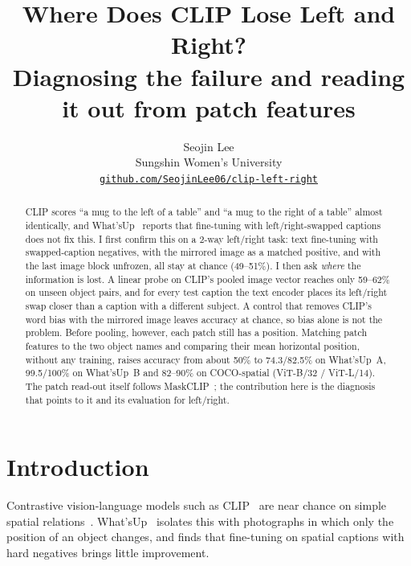 \documentclass[10pt,twocolumn,letterpaper]{article}
\title{Where Does CLIP Lose Left and Right?\\
\large Diagnosing the failure and reading it out from patch features}
\author{Seojin Lee\\
Sungshin Women's University\\
{\tt\small \href{https://github.com/SeojinLee06/clip-left-right}{github.com/SeojinLee06/clip-left-right}}
}
\begin{document}
\maketitle

\begin{abstract}
CLIP scores ``a mug to the left of a table'' and ``a mug to the right of a table'' almost identically, and What'sUp~\cite{kamath2023whatsup} reports that fine-tuning with left/right-swapped captions does not fix this.
I first confirm this on a 2-way left/right task: text fine-tuning with swapped-caption negatives, with the mirrored image as a matched positive, and with the last image block unfrozen, all stay at chance (49--51\%).
I then ask \emph{where} the information is lost.
A linear probe on CLIP's pooled image vector reaches only 59--62\% on unseen object pairs, and for every test caption the text encoder places its left/right swap closer than a caption with a different subject.
A control that removes CLIP's word bias with the mirrored image leaves accuracy at chance, so bias alone is not the problem.
Before pooling, however, each patch still has a position.
Matching patch features to the two object names and comparing their mean horizontal position, without any training, raises accuracy from about 50\% to 74.3/82.5\% on What'sUp~A, 99.5/100\% on What'sUp~B and 82--90\% on COCO-spatial (ViT-B/32 / ViT-L/14).
The patch read-out itself follows MaskCLIP~\cite{zhou2022maskclip}; the contribution here is the diagnosis that points to it and its evaluation for left/right.
\end{abstract}

\section{Introduction}
\label{sec:intro}

Contrastive vision-language models such as CLIP~\cite{radford2021clip} are near chance on simple spatial relations~\cite{kamath2023whatsup,liu2023vsr,yuksekgonul2023aro}.
What'sUp~\cite{kamath2023whatsup} isolates this with photographs in which only the position of an object changes, and finds that fine-tuning on spatial captions with hard negatives brings little improvement.
\end{document}
